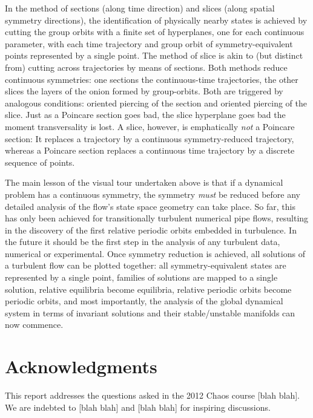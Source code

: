 \documentclass{article}
\begin{document}
In the method of sections (along time direction) and slices (along
spatial symmetry directions), the identification of physically nearby
states is achieved by cutting the group orbits with a finite set of
hyperplanes, one for each continuous parameter, with each time trajectory
and group orbit of symmetry-equivalent points represented by a single
point. The method of slice is akin to (but distinct
from) cutting across trajectories by means of sections. Both methods
reduce continuous symmetries: one sections the continuous-time
trajectories, the other slices the layers of the onion formed by
group-orbits. Both are triggered by analogous conditions: oriented
piercing of the section and oriented piercing of the slice. Just as a
 Poincare section goes bad, the slice hyperplane goes bad the moment
transversality is lost. A slice, however, is emphatically \emph{not} a
Poincare section: It replaces a trajectory by a continuous symmetry-reduced
trajectory, whereas a Poincare section replaces a continuous time trajectory by
a discrete sequence of points.

The main lesson of the visual tour undertaken above is that if a
dynamical problem has a continuous symmetry, the symmetry \emph{must} be
reduced before any detailed analysis of the flow's state space geometry can
take place. So far, this has only been achieved for transitionally
turbulent numerical pipe flows,\cite{ACHKW11} resulting in the discovery of
the first relative periodic orbits embedded in turbulence. In the future it should be the
first step in the analysis of any turbulent data, numerical\cite{CvGr12} or
experimental.\cite{BCS12} Once symmetry reduction is achieved, all
solutions of a turbulent flow can be plotted together: all
symmetry-equivalent states are represented by a single point, families of
solutions are mapped to a single solution, relative equilibria become equilibria, relative periodic orbits
become periodic orbits, and most importantly, the analysis of the global dynamical
system in terms of invariant solutions and their stable/unstable
manifolds can now commence.

\section*{Acknowledgments}
This report addresses the questions asked in the  2012 Chaos course
[blah blah]. We are indebted to [blah blah] and [blah blah] for inspiring discussions.





\end{document}
